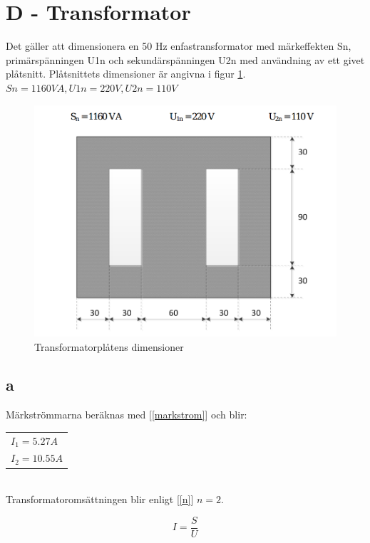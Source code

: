 \documentclass{article}
\begin{document}
\section{D - Transformator}
Det gäller att dimensionera en 50 Hz enfastransformator med märkeffekten Sn, primärspänningen
U1n och sekundärspänningen U2n med användning av ett givet plåtsnitt. Plåtsnittets dimensioner
är angivna i figur \ref{fig:trafo}.
$Sn = 1160 VA, U1n = 220 V,U2n = 110 V$


 \begin{figure}[H]
 \begin{center}
 \includegraphics[width=1\textwidth]{img/transformatorplat.png} %
 \caption{Transformatorplåtens dimensioner}
 \label{fig:trafo}
 \end{center}
 \end{figure}

\subsection{a}
Märkströmmarna beräknas med [\ref{markstrom}] och blir:
\begin{tabular}{|l}
  $I_1=5.27 A$\\
  $I_2=10.55 A$\\
\end{tabular}
\\
Transformatoromsättningen blir enligt [\ref{n}] $n=2$.

\begin{equation}
  I=\frac{S}{U}
  \label{markstrom}
\end{equation}
\end{document}
